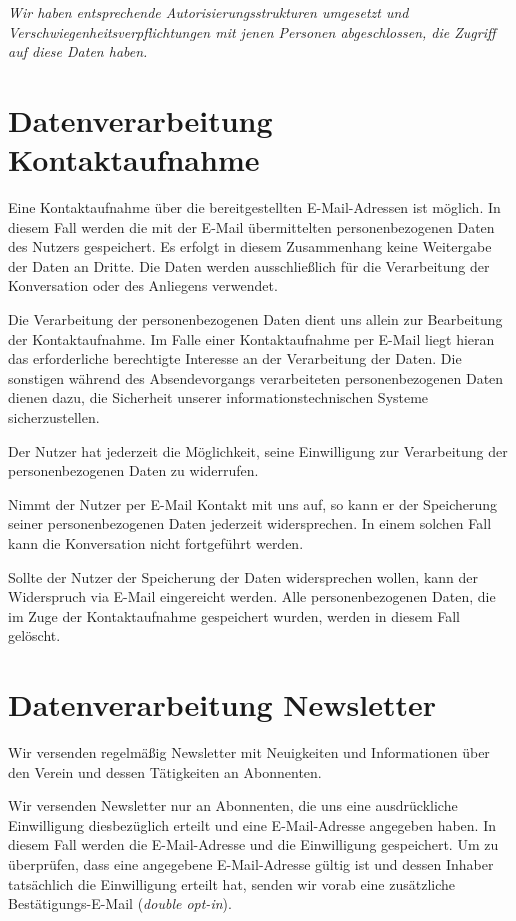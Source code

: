 \documentclass[a4paper, 10pt, headings=normal]{scrartcl}
\begin{document}
\begin{multicols*}{2}
\emph{Wir haben entsprechende Autorisierungsstrukturen umgesetzt und Verschwiegenheitsverpflichtungen mit jenen Personen abgeschlossen, die Zugriff auf diese Daten haben.}

\section{Datenverarbeitung Kontaktaufnahme}

Eine Kontaktaufnahme über die bereitgestellten E-Mail-Adressen ist möglich.
In diesem Fall werden die mit der E-Mail übermittelten personenbezogenen Daten des Nutzers gespeichert.
Es erfolgt in diesem Zusammenhang keine Weitergabe der Daten an Dritte. Die Daten werden ausschließlich für die Verarbeitung der Konversation oder des Anliegens verwendet.

Die Verarbeitung der personenbezogenen Daten dient uns allein zur Bearbeitung der Kontaktaufnahme.
Im Falle einer Kontaktaufnahme per E-Mail liegt hieran das erforderliche berechtigte Interesse an der Verarbeitung der Daten.
Die sonstigen während des Absendevorgangs verarbeiteten personenbezogenen Daten dienen dazu, die Sicherheit unserer informationstechnischen Systeme sicherzustellen.

Der Nutzer hat jederzeit die Möglichkeit, seine Einwilligung zur Verarbeitung der personenbezogenen Daten zu widerrufen.

Nimmt der Nutzer per E-Mail Kontakt mit uns auf, so kann er der Speicherung seiner personenbezogenen Daten jederzeit widersprechen.
In einem solchen Fall kann die Konversation nicht fortgeführt werden.

Sollte der Nutzer der Speicherung der Daten widersprechen wollen, kann der Widerspruch via E-Mail eingereicht werden.
Alle personenbezogenen Daten, die im Zuge der Kontaktaufnahme gespeichert wurden, werden in diesem Fall gelöscht.

\section{Datenverarbeitung Newsletter}

Wir versenden regelmäßig Newsletter mit Neuigkeiten und Informationen über den Verein und dessen Tätigkeiten an Abonnenten.

Wir versenden Newsletter nur an Abonnenten, die uns eine ausdrückliche Einwilligung diesbezüglich erteilt und eine E-Mail-Adresse angegeben haben.
In diesem Fall werden die E-Mail-Adresse und die Einwilligung gespeichert.
Um zu überprüfen, dass eine angegebene E-Mail-Adresse gültig ist und dessen Inhaber tatsächlich die Einwilligung erteilt hat, senden wir vorab eine zusätzliche Bestätigungs-E-Mail (\emph{double opt-in}).


\end{multicols*}
\end{document}
